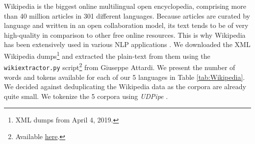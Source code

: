 \begin{table}[t!]
    \centering\small
    \caption{Size of Wikipedia corpora, measured in bytes, thousands of tokens, words and sentences.}
    \label{tab:Wikipedia}
\end{table}

Wikipedia is the biggest online multilingual open encyclopedia, comprising more than 40 million articles in 301 different languages. Because articles are curated by language and written in an open collaboration model, its text tends to be of very high-quality in comparison to other free online resources. This is why Wikipedia has been extensively used in various NLP applications \citep{wu-weld-2010-open,mihalcea-2007-using,al-rfou-etal-2013-polyglot,bojanowski-etal-2017-enriching}. We downloaded the XML Wikipedia dumps\footnote{XML dumps from April 4, 2019.} and extracted the plain-text from them using the \texttt{wikiextractor.py} script\footnote{Available \href{https://github.com/attardi/wikiextractor}{here}.} from Giuseppe Attardi. We present the number of words and tokens available for each of our 5 languages in Table \ref{tab:Wikipedia}. We decided against deduplicating the Wikipedia data as the corpora are already quite small. We tokenize the 5 corpora using \emph{UDPipe} \citep{straka-strakova-2017-tokenizing}.

